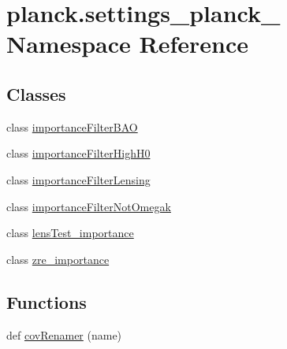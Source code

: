 \hypertarget{namespaceplanck_1_1settings__planck__2015}{}\section{planck.\+settings\+\_\+planck\+\_ Namespace Reference}
\label{namespaceplanck_1_1settings__planck__2015}
\subsection*{Classes}
\begin{DoxyCompactItemize}
\item 
class \mbox{\hyperlink{classplanck_1_1settings__planck__2015_1_1importanceFilterBAO}{importance\+Filter\+B\+AO}}
\item 
class \mbox{\hyperlink{classplanck_1_1settings__planck__2015_1_1importanceFilterHighH0}{importance\+Filter\+High\+H0}}
\item 
class \mbox{\hyperlink{classplanck_1_1settings__planck__2015_1_1importanceFilterLensing}{importance\+Filter\+Lensing}}
\item 
class \mbox{\hyperlink{classplanck_1_1settings__planck__2015_1_1importanceFilterNotOmegak}{importance\+Filter\+Not\+Omegak}}
\item 
class \mbox{\hyperlink{classplanck_1_1settings__planck__2015_1_1lensTest__importance}{lens\+Test\+\_\+importance}}
\item 
class \mbox{\hyperlink{classplanck_1_1settings__planck__2015_1_1zre__importance}{zre\+\_\+importance}}
\end{DoxyCompactItemize}
\subsection*{Functions}
\begin{DoxyCompactItemize}
\item 
def \mbox{\hyperlink{namespaceplanck_1_1settings__planck__2015_ad5a9e9753f087ecf6ea778f9bb1bbd2b}{cov\+Renamer}} (name)
\end{DoxyCompactItemize}
